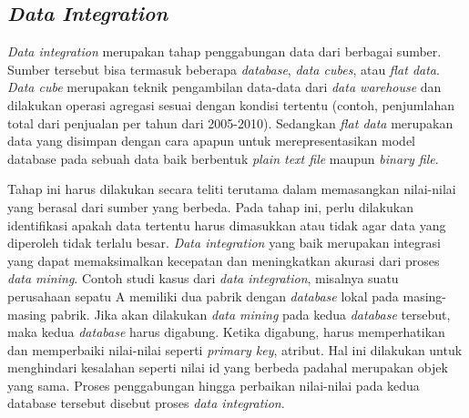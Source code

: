 

\subsection{\textsl{Data Integration}}
\textsl{Data integration} merupakan tahap penggabungan data dari berbagai sumber. Sumber tersebut bisa termasuk beberapa \textsl{database}, \textsl{data cubes}, atau \textsl{flat data}. \textsl{Data cube} merupakan teknik pengambilan data-data dari \textsl{data warehouse} dan dilakukan operasi agregasi sesuai dengan kondisi tertentu (contoh, penjumlahan total dari penjualan per tahun dari 2005-2010). Sedangkan \textsl{flat data} merupakan data yang disimpan dengan cara apapun untuk merepresentasikan model database pada sebuah data baik berbentuk \textsl{plain text file} maupun \textsl{binary file}. 

Tahap ini harus dilakukan secara teliti terutama dalam memasangkan nilai-nilai yang berasal dari sumber yang berbeda. Pada tahap ini, perlu dilakukan identifikasi apakah data tertentu harus dimasukkan atau tidak agar data yang diperoleh tidak terlalu besar. \textsl{Data integration} yang baik merupakan integrasi yang dapat memaksimalkan kecepatan dan meningkatkan akurasi dari proses \textsl{data mining}. Contoh studi kasus dari \textsl{data integration}, misalnya suatu perusahaan sepatu A memiliki dua pabrik dengan \textsl{database} lokal pada masing-masing pabrik. Jika akan dilakukan \textsl{data mining} pada kedua \textsl{database }tersebut, maka kedua \textsl{database} harus digabung. Ketika digabung, harus memperhatikan dan memperbaiki nilai-nilai seperti \textsl{primary key}, atribut. Hal ini dilakukan untuk menghindari kesalahan seperti nilai id yang berbeda padahal merupakan objek yang sama. Proses penggabungan hingga perbaikan nilai-nilai pada kedua database tersebut disebut proses \textsl{data integration}.

